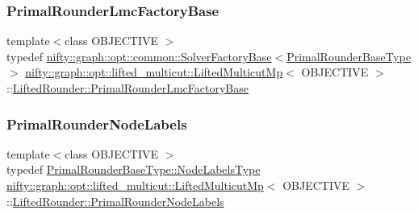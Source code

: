 \subsubsection{\texorpdfstring{Primal\+Rounder\+Lmc\+Factory\+Base}{PrimalRounderLmcFactoryBase}}
{\footnotesize\ttfamily template$<$class O\+B\+J\+E\+C\+T\+I\+VE $>$ \\
typedef \hyperlink{classnifty_1_1graph_1_1opt_1_1common_1_1SolverFactoryBase}{nifty\+::graph\+::opt\+::common\+::\+Solver\+Factory\+Base}$<$\hyperlink{structnifty_1_1graph_1_1opt_1_1lifted__multicut_1_1LiftedMulticutMp_1_1LiftedRounder_a4f36e999999e10b1a2c4a78d724ee847}{Primal\+Rounder\+Base\+Type}$>$ \hyperlink{classnifty_1_1graph_1_1opt_1_1lifted__multicut_1_1LiftedMulticutMp}{nifty\+::graph\+::opt\+::lifted\+\_\+multicut\+::\+Lifted\+Multicut\+Mp}$<$ O\+B\+J\+E\+C\+T\+I\+VE $>$\+::\hyperlink{structnifty_1_1graph_1_1opt_1_1lifted__multicut_1_1LiftedMulticutMp_1_1LiftedRounder_a0b0e44f6ebf431a6776874d27243c11d}{Lifted\+Rounder\+::\+Primal\+Rounder\+Lmc\+Factory\+Base}}

\mbox{\label{structnifty_1_1graph_1_1opt_1_1lifted__multicut_1_1LiftedMulticutMp_1_1LiftedRounder_ab6b004c812de6e59bf80574a15ad9043}} 
\subsubsection{\texorpdfstring{Primal\+Rounder\+Node\+Labels}{PrimalRounderNodeLabels}}
{\footnotesize\ttfamily template$<$class O\+B\+J\+E\+C\+T\+I\+VE $>$ \\
typedef \hyperlink{classnifty_1_1graph_1_1opt_1_1common_1_1SolverBase_abefd51561de2fd009f6bed6bef6009ea}{Primal\+Rounder\+Base\+Type\+::\+Node\+Labels\+Type} \hyperlink{classnifty_1_1graph_1_1opt_1_1lifted__multicut_1_1LiftedMulticutMp}{nifty\+::graph\+::opt\+::lifted\+\_\+multicut\+::\+Lifted\+Multicut\+Mp}$<$ O\+B\+J\+E\+C\+T\+I\+VE $>$\+::\hyperlink{structnifty_1_1graph_1_1opt_1_1lifted__multicut_1_1LiftedMulticutMp_1_1LiftedRounder_ab6b004c812de6e59bf80574a15ad9043}{Lifted\+Rounder\+::\+Primal\+Rounder\+Node\+Labels}}


